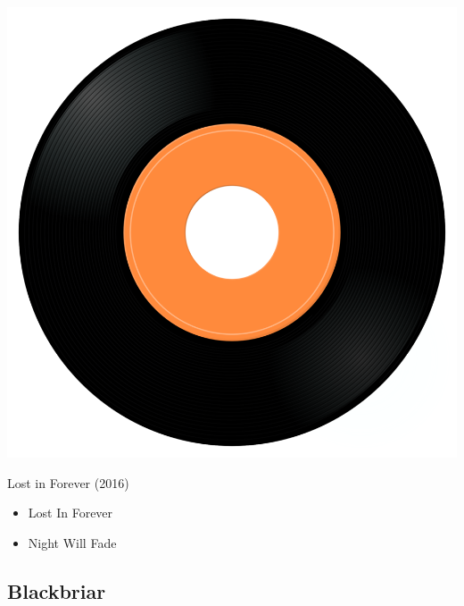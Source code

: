 \begin{minipage}[t]{0.25\textwidth}
\captionsetup{type=figure}
\includegraphics[width=\textwidth]{Images/cover.png}
\caption*{Lost in Forever (2016)}
\end{minipage}
\begin{minipage}[t]{0.25\textwidth}\vspace{0pt}
\begin{itemize}[nosep,leftmargin=1em,labelwidth=*,align=left]
	\setlength{\itemsep}{0pt}
	\item Lost In Forever
	\item Night Will Fade
\end{itemize}
\end{minipage}


\subsection{Blackbriar}


